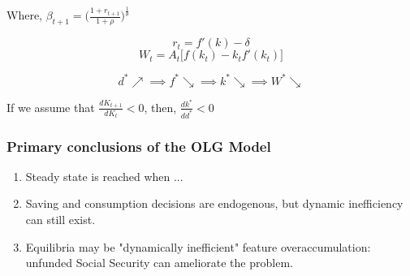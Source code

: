 Where, $\beta_{t+1}=\big(\frac{1+r_{t+1}}{1+\rho}\big)^{\frac{1}{\theta}} $

\begin{equation*}
    r_{t}=f'(k)-\delta
\end{equation*}
\begin{equation*}
    W_{t}=A_{t}\bigg[ f(k_{t})-k_{t}f'(k_{t})\bigg]
\end{equation*}

\begin{equation*}
    d^*\nearrow \implies f^*\searrow \implies k^*\searrow \implies W^*\searrow
\end{equation*}

If we assume that $\frac{d K_{t+1}}{d K_{t}}<0$, then, $\frac{dk^*}{d d^*}<0$




\subsubsection{Primary conclusions of the OLG Model}
\begin{enumerate}[i]
  \item Steady state is reached when ...
  \item Saving and consumption decisions are endogenous, but dynamic inefficiency can still exist.
  \item Equilibria may be "dynamically inefficient" feature overaccumulation: unfunded Social Security can ameliorate the problem.
\end{enumerate}